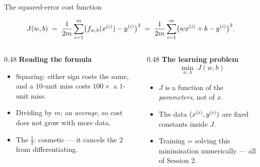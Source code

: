 \documentclass[aspectratio=169,10pt]{beamer}
\begin{document}
\begin{frame}{The squared-error cost function}
  \begin{defnbox}
    \[
      J(w,b)\;=\;\frac{1}{2m}\sum_{i=1}^{m}\bigl(f_{w,b}(x^{(i)})-y^{(i)}\bigr)^{2}
             \;=\;\frac{1}{2m}\sum_{i=1}^{m}\bigl(wx^{(i)}+b-y^{(i)}\bigr)^{2}.
    \]
  \end{defnbox}
  \footnotesize
  \begin{columns}[T,onlytextwidth]
    \begin{column}{0.48\textwidth}
      \textbf{Reading the formula}
      \begin{itemize}
        \item Squaring: either sign costs the same, and a $10$-unit miss
              costs $100\times$ a $1$-unit miss.
        \item Dividing by $m$: an \emph{average}, so cost does not grow with
              more data.
        \item The $\tfrac12$: cosmetic --- it cancels the $2$ from
              differentiating.
      \end{itemize}
    \end{column}
    \begin{column}{0.48\textwidth}
      \textbf{The learning problem}
      \[
        \min_{w,\,b}\; J(w,b)
      \]
      \begin{itemize}
        \item $J$ is a function of the \emph{parameters}, not of $x$.
        \item The data $(x^{(i)},y^{(i)})$ are fixed constants inside $J$.
        \item Training = solving this minimisation numerically --- all of
              Session 2.
      \end{itemize}
    \end{column}
  \end{columns}
\end{frame}
\end{document}
